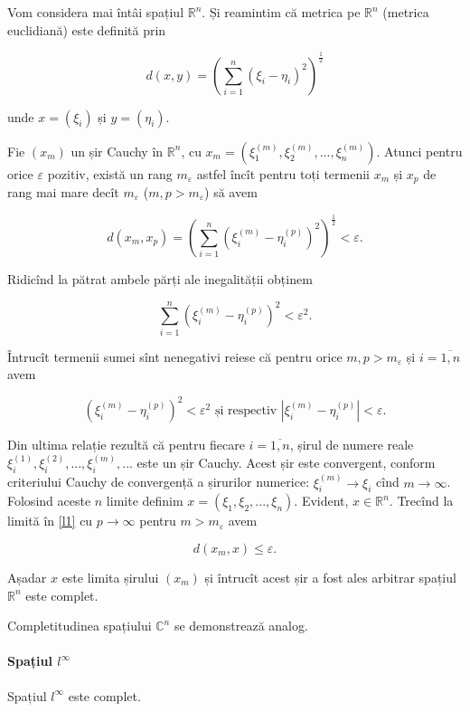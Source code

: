 \documentclass[a4paper,12pt]{article}
\theoremstyle{change}
\newenvironment{proof}[1][Proof]{\begin{trivlist}
\item[\hskip \labelsep {\bfseries #1}]}{\end{trivlist}}
\begin{document}
\begin{proof}[Într-adevăr]
Vom considera mai întâi spațiul $\mathbb{R}^n$.
Și reamintim că metrica pe $\mathbb{R}^n$ (metrica euclidiană) este definită prin 

\[ d(x,y) = \left(\sum_{i=1}^n (\xi_i - \eta_i)^2\right)^\frac{1}{2} \]

\noindent unde $x=(\xi_i)$ și $y=(\eta_i)$. 

Fie $(x_m)$ un șir Cauchy în $\mathbb{R}^n$, cu $x_m=(\xi_1^{(m)},\xi_2^{(m)},...,\xi_n^{(m)})$. Atunci pentru orice $\varepsilon$ pozitiv, există un rang $m_{\varepsilon}$ astfel încît pentru toți termenii $x_m$ și $x_p$ de rang mai mare decît $m_{\varepsilon}$ ($m,p>m_{\varepsilon}$) să avem

\begin{equation}\label{l1}
d(x_m,x_p) = \left(\sum_{i=1}^n (\xi_i^{(m)}-\eta_i^{(p)})^2\right)^\frac{1}{2} < \varepsilon.
\end{equation}

Ridicînd la pătrat ambele părți ale inegalității obținem

\[ \sum_{i=1}^n (\xi_i^{(m)}-\eta_i^{(p)})^2 < \varepsilon^2. \]

Întrucît termenii sumei sînt nenegativi reiese că pentru orice $m,p>m_\varepsilon$ și $i=\overline{1,n}$ avem

\[ (\xi_i^{(m)}-\eta_i^{(p)})^2 < \varepsilon^2 \text{ și respectiv } |\xi_i^{(m)}-\eta_i^{(p)}| < \varepsilon. \]

Din ultima relație rezultă că pentru fiecare $i=\overline{1,n}$,  șirul de numere reale $\xi_i^{(1)}, \xi_i^{(2)}, ..., \xi_i^{(m)}, ...$ este un șir Cauchy. Acest șir este convergent, conform criteriului Cauchy de convergență a șirurilor numerice: $\xi_i^{(m)}\to \xi_i$ cînd $m\to\infty$. Folosind aceste $n$ limite definim $x=(\xi_1,\xi_2,...,\xi_n)$. Evident, $x\in\mathbb{R}^n$. Trecînd la limită în \eqref{l1} cu $p\to\infty$ pentru $m>m_\varepsilon$ avem

\[ d(x_m,x)\leq\varepsilon. \]

Așadar $x$ este limita șirului $(x_m)$ și întrucît acest șir a fost ales arbitrar spațiul $\mathbb{R}^n$ este complet.

Completitudinea spațiului $\mathbb{C}^n$ se demonstrează analog.

\end{proof}

\paragraph{Spațiul $l^\infty$} Spațiul $l^\infty$ este complet.
\end{document}
